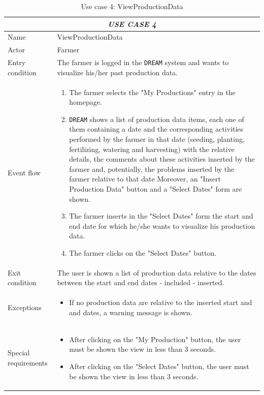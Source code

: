 \documentclass{article}
\begin{document}
\centering
\begin{longtable}{|p{3.5cm}|m{8cm}|}
\caption{Use case 4: ViewProductionData}
 \label{uc4}
 \hline
 \multicolumn{2}{|c|}{\cellcolor{white}\emph{USE CASE 4}} \\
 \endfirsthead
 \endhead
 \endfoot
 \endlastfoot
 \hline
 Name & ViewProductionData\\
 \hline
 Actor & Farmer\\
 \hline
 Entry condition & The farmer is logged in the \verb|DREAM| system and wants to visualize his/her past production data.\\
 \hline
 Event flow & \begin{enumerate}
    \item The farmer selects the "My Productions" entry in the homepage.
    \item \verb|DREAM| shows a list of production data items, each one of them containing a date and the corresponding activities performed by the farmer in that date (seeding, planting, fertilizing, watering and harvesting) with the relative details, the comments about these activities inserted by the farmer and, potentially, the problems inserted by the farmer relative to that date Moreover, an "Insert Production Data" button and a "Select Dates" form are shown.
    \item The farmer inserts in the "Select Dates" form the start and end date for which he/she wants to visualize his production data.
    \item The farmer clicks on the "Select Dates" button.
 \end{enumerate}\\
 \hline
 Exit condition & The user is shown a list of production data relative to the dates between the start and end dates - included - inserted.\\
 \hline
 Exceptions & \begin{itemize}
     \item If no production data are relative to the inserted start and and dates, a warning message is shown.
 \end{itemize}\\
 \hline
 Special requirements & \begin{itemize}
     \item After clicking on the "My Production" button, the user must be shown the view in less than 3 seconds.
     \item After clicking on the "Select Dates" button, the user must be shown the view in less than 3 seconds.
 \end{itemize}\\
 \hline
\end{longtable}
\end{document}
